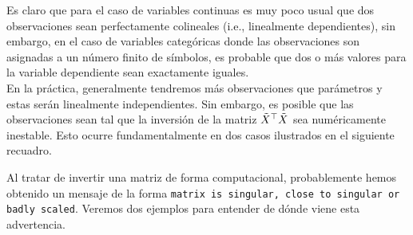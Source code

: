 Es claro que para el caso de variables continuas es muy poco usual que dos observaciones sean perfectamente colineales (i.e., linealmente dependientes), sin embargo, en el caso de variables categóricas donde las observaciones son asignadas a un número finito de símbolos, es probable que dos o más valores para la variable dependiente sean exactamente iguales. \\

En la práctica, generalmente tendremos más observaciones que parámetros y estas serán linealmente independientes. Sin embargo, es posible que las observaciones sean tal que la inversión de la matriz  $\tilde{X}^\top\tilde{X}$ sea numéricamente  inestable. Esto ocurre fundamentalmente en dos casos ilustrados en el siguiente recuadro.  

\begin{mdframed}[style=discusion, frametitle={\center Matriz cuasi-singular o incorrectamente escalada}]

Al tratar de invertir una matriz de forma computacional, probablemente hemos obtenido un mensaje de la forma \texttt{matrix is singular, close to singular or badly scaled}. Veremos dos ejemplos para entender de dónde viene esta advertencia. \\


\end{mdframed}
